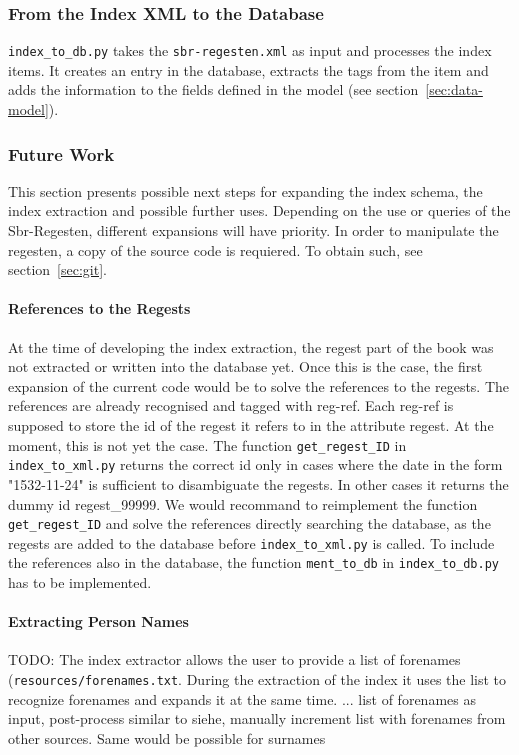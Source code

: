 \subsubsection{From the Index XML to the Database}
\texttt{index\_to\_db.py} takes the \texttt{sbr-regesten.xml} as input and processes the index items. It creates an entry in the database, extracts the tags from the item and adds the information to the fields defined in the model (see section~\ref{sec:data-model}).





\subsubsection{Future Work}

This section presents possible next steps for expanding the index schema, the index extraction and possible further uses. Depending on the use or queries of the Sbr-Regesten, different expansions will have priority. In order to manipulate the regesten, a copy of the source code is requiered. To obtain such, see section~\ref{sec:git}.

\paragraph{References to the Regests}
At the time of developing the index extraction, the regest part of the book was not extracted or written into the database yet. Once this is the case, the first expansion of the current code would be to solve the references to the regests. The references are already recognised and tagged with reg-ref. Each reg-ref is supposed to store the id of the regest it refers to in the attribute regest. At the moment, this is not yet the case. The function \texttt{get\_regest\_ID} in \texttt{index\_to\_xml.py} returns the correct id only in cases where the date in the form "1532-11-24" is sufficient to disambiguate the regests. In other cases it returns the dummy id regest\_99999. We would recommand to reimplement the function \texttt{get\_regest\_ID} and solve the references directly searching the database, as the regests are added to the database before \texttt{index\_to\_xml.py} is called. To include the references also in the database, the function \texttt{ment\_to\_db} in \texttt{index\_to\_db.py} has to be implemented.

\paragraph{Extracting Person Names}
TODO: The index extractor allows the user to provide a list of forenames (\texttt{resources/forenames.txt}. During the extraction of the index it uses the list to recognize forenames and expands it at the same time. ...
list of forenames as input, post-process similar to siehe, manually increment list with forenames from other sources. Same would be possible for surnames

